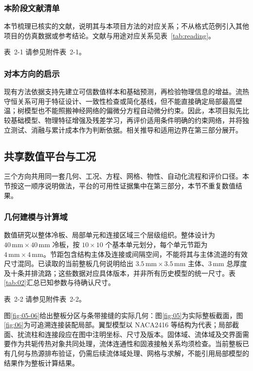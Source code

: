 \documentclass[UTF8]{midterm}
\makeatletter
\newcommand{\submissionnumber}[1]{\def\@currentlabel{#1}}
\makeatother
\begin{document}
\subsubsection{本阶段文献清单}
本节梳理已核实的文献，说明其与本项目方法的对应关系；不从格式范例引入其他项目的仿真数据或参考结论。文献与用途对应关系见表~\ref{tab:reading}。

\par\noindent \begingroup\submissionnumber{2-1}\label{tab:reading}\endgroup 表~2-1 请参见附件表~2-1。\par

\subsubsection{对本方向的启示}
现有方法依据支持先建立可信数值样本和基础预测，再检验物理信息的增益。流热守恒关系可用于特征设计、一致性检查或简化基线，但不能直接确定局部最高壁温；树模型也不能照搬神经网络的偏微分方程自动微分约束。因此，本项目拟先比较基础模型、物理特征增强及残差学习，再评价适用条件明确的约束网络，并将独立测试、消融与累计成本作为判断依据。相关推导和适用边界在第三部分展开。



\subsection{共享数值平台与工况}
三个方向共用同一套几何、工况、方程、网格、物性、自动化流程和评价口径。本节按这一顺序说明做法，平台的可用性证据集中在第三部分，本节不重复数值结果。

\subsubsection{几何建模与计算域}
数值研究以整体冷板、局部单元和连接区域三个层级组织。整体设计为 $40\,\mathrm{mm}\times40\,\mathrm{mm}$ 冷板，按 $10\times10$ 个基本单元划分，每个单元节距为 $4\,\mathrm{mm}\times4\,\mathrm{mm}$。节距包含结构主体及连接或间隔空间，不能将其与主体流道的有效尺寸混同。已读取的当前整板几何说明给出 $3.5\,\mathrm{mm}\times3.5\,\mathrm{mm}$ 主体、$3\,\mathrm{mm}$ 总厚度及十条并排流路；这些数据对应具体版本，并非所有历史模型的统一尺寸。表\ref{tab:02}汇总已知参数与待确认尺寸。

\par\noindent \begingroup\submissionnumber{2-2}\label{tab:02}\endgroup 表~2-2 请参见附件表~2-2。\par


图\ref{fig:05-06}给出整板分区与条带接缝的实际几何：图\ref{fig:05}为实际整板截面，图\ref{fig:06}为可追溯连接装配局部。翼型模型以 NACA2416 等结构为代表；局部截面、扰流柱和连接段应在图中注明坐标、尺寸及版本。固体域、流体域及交界面需要作为共轭传热对象共同处理，流体连通性和固液接触关系均须检查。当前整板已有几何与热源排布验证，仍需后续流体域处理、网格与求解，不能引用局部模型的结果作为整板计算结果。
\end{document}
